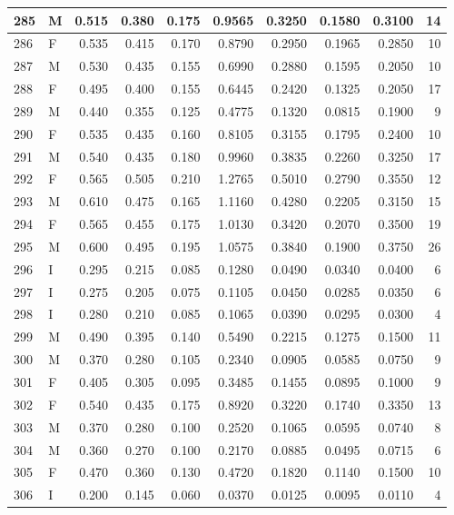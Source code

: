 \documentclass[9pt,twocolumn,twoside,]{pnas-new}
\begin{document}
\begin{tabular}{l|l|r|r|r|r|r|r|r|r}
\hline
285 & M & 0.515 & 0.380 & 0.175 & 0.9565 & 0.3250 & 0.1580 & 0.3100 & 14\\
\hline
286 & F & 0.535 & 0.415 & 0.170 & 0.8790 & 0.2950 & 0.1965 & 0.2850 & 10\\
\hline
287 & M & 0.530 & 0.435 & 0.155 & 0.6990 & 0.2880 & 0.1595 & 0.2050 & 10\\
\hline
288 & F & 0.495 & 0.400 & 0.155 & 0.6445 & 0.2420 & 0.1325 & 0.2050 & 17\\
\hline
289 & M & 0.440 & 0.355 & 0.125 & 0.4775 & 0.1320 & 0.0815 & 0.1900 & 9\\
\hline
290 & F & 0.535 & 0.435 & 0.160 & 0.8105 & 0.3155 & 0.1795 & 0.2400 & 10\\
\hline
291 & M & 0.540 & 0.435 & 0.180 & 0.9960 & 0.3835 & 0.2260 & 0.3250 & 17\\
\hline
292 & F & 0.565 & 0.505 & 0.210 & 1.2765 & 0.5010 & 0.2790 & 0.3550 & 12\\
\hline
293 & M & 0.610 & 0.475 & 0.165 & 1.1160 & 0.4280 & 0.2205 & 0.3150 & 15\\
\hline
294 & F & 0.565 & 0.455 & 0.175 & 1.0130 & 0.3420 & 0.2070 & 0.3500 & 19\\
\hline
295 & M & 0.600 & 0.495 & 0.195 & 1.0575 & 0.3840 & 0.1900 & 0.3750 & 26\\
\hline
296 & I & 0.295 & 0.215 & 0.085 & 0.1280 & 0.0490 & 0.0340 & 0.0400 & 6\\
\hline
297 & I & 0.275 & 0.205 & 0.075 & 0.1105 & 0.0450 & 0.0285 & 0.0350 & 6\\
\hline
298 & I & 0.280 & 0.210 & 0.085 & 0.1065 & 0.0390 & 0.0295 & 0.0300 & 4\\
\hline
299 & M & 0.490 & 0.395 & 0.140 & 0.5490 & 0.2215 & 0.1275 & 0.1500 & 11\\
\hline
300 & M & 0.370 & 0.280 & 0.105 & 0.2340 & 0.0905 & 0.0585 & 0.0750 & 9\\
\hline
301 & F & 0.405 & 0.305 & 0.095 & 0.3485 & 0.1455 & 0.0895 & 0.1000 & 9\\
\hline
302 & F & 0.540 & 0.435 & 0.175 & 0.8920 & 0.3220 & 0.1740 & 0.3350 & 13\\
\hline
303 & M & 0.370 & 0.280 & 0.100 & 0.2520 & 0.1065 & 0.0595 & 0.0740 & 8\\
\hline
304 & M & 0.360 & 0.270 & 0.100 & 0.2170 & 0.0885 & 0.0495 & 0.0715 & 6\\
\hline
305 & F & 0.470 & 0.360 & 0.130 & 0.4720 & 0.1820 & 0.1140 & 0.1500 & 10\\
\hline
306 & I & 0.200 & 0.145 & 0.060 & 0.0370 & 0.0125 & 0.0095 & 0.0110 & 4\\

\end{tabular}
\end{document}

